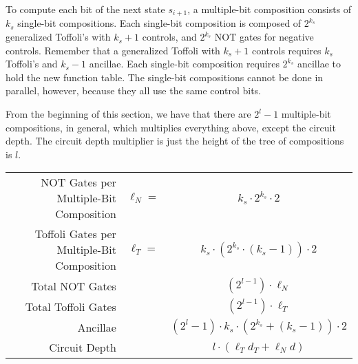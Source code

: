 To compute each bit of the next state
$s_{i+1}$, a multiple-bit composition consists of 
$k_s$ single-bit compositions. Each single-bit composition is
composed of $2^{k_s}$ generalized Toffoli's with $k_s +1$ controls, and
$2^{k_s}$ NOT gates for negative controls. Remember that a generalized
Toffoli with $k_s + 1$ controls requires $k_s$ Toffoli's and $k_s - 1$
ancillae. Each single-bit composition requires $2^{k_s}$ ancillae to
hold the new function table. The single-bit compositions cannot be done
in parallel, however, because they all use the same control bits.

From the beginning of this section, we have that there are $2^l - 1$
multiple-bit compositions, in general, which multiplies everything above,
except the circuit depth. The circuit depth multiplier is
just the height of the tree of compositions is $l$.

\begin{table}[!h]
\begin{center}
\begin{tabular}{|r|cc|}
\hline
NOT Gates per Multiple-Bit Composition & $\ell_N = $ & $k_s \cdot 2^{k_s} \cdot 2$ \\
Toffoli Gates per Multiple-Bit Composition & $\ell_T = $ & $k_s \cdot (2^{k_s}\cdot (k_s-1)) \cdot 2$\\
Total NOT Gates & & $(2^{l-1}) \cdot \ell_N$ \\
Total Toffoli Gates & & $(2^{l-1}) \cdot \ell_T$ \\
Ancillae & & $(2^l - 1)\cdot k_s \cdot (2^{k_s} + (k_s - 1)) \cdot 2$\\
Circuit Depth & & $l\cdot(\ell_T d_T + \ell_N d)$\\
\hline
\end{tabular}
\end{center}
\end{table}